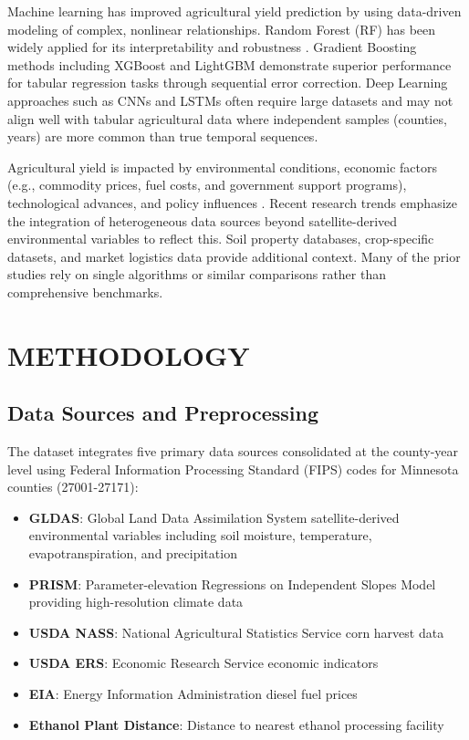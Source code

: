 \documentclass[10pt,twocolumn]{article}
\begin{document}
Machine learning has improved agricultural yield prediction by using data-driven modeling of complex, nonlinear relationships. Random Forest (RF) has been widely applied for its interpretability and robustness \cite{prasetyo2024}. Gradient Boosting methods including XGBoost \cite{chen2016} and LightGBM \cite{ke2017} demonstrate superior performance for tabular regression tasks through sequential error correction. Deep Learning approaches such as CNNs \cite{nevavuori2020,shahhosseini2021} and LSTMs often require large datasets and may not align well with tabular agricultural data where independent samples (counties, years) are more common than true temporal sequences.

Agricultural yield is impacted by environmental conditions, economic factors (e.g., commodity prices, fuel costs, and government support programs), technological advances, and policy influences \cite{desloires2024,ji2022}. Recent research trends emphasize the integration of heterogeneous data sources beyond satellite-derived environmental variables to reflect this. Soil property databases, crop-specific datasets, and market logistics data provide additional context. Many of the prior studies rely on single algorithms or similar comparisons rather than comprehensive benchmarks.

\section{METHODOLOGY}

\subsection{Data Sources and Preprocessing}

The dataset integrates five primary data sources consolidated at the county-year level using Federal Information Processing Standard (FIPS) codes for Minnesota counties (27001-27171):

\begin{itemize}
    \item \textbf{GLDAS}: Global Land Data Assimilation System satellite-derived environmental variables including soil moisture, temperature, evapotranspiration, and precipitation
    \item \textbf{PRISM}: Parameter-elevation Regressions on Independent Slopes Model providing high-resolution climate data
    \item \textbf{USDA NASS}: National Agricultural Statistics Service corn harvest data
    \item \textbf{USDA ERS}: Economic Research Service economic indicators
    \item \textbf{EIA}: Energy Information Administration diesel fuel prices
    \item \textbf{Ethanol Plant Distance}: Distance to nearest ethanol processing facility
\end{itemize}
\end{document}

